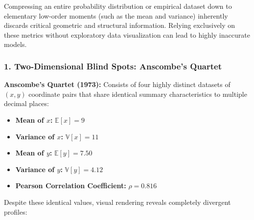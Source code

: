\documentclass{article}
\begin{document}
Compressing an entire probability distribution or empirical dataset down to elementary low-order moments (such as the mean and variance) inherently discards critical geometric and structural information. Relying exclusively on these metrics without exploratory data visualization can lead to highly inaccurate models.

\subsubsection*{1. Two-Dimensional Blind Spots: Anscombe's Quartet}

\noindent \textbf{Anscombe's Quartet (1973):} Consists of four highly distinct datasets of $(x,y)$ coordinate pairs that share identical summary characteristics to multiple decimal places:
\begin{itemize}
    \item \textbf{Mean of $x$:} $\mathbb{E}[x] = 9$
    \item \textbf{Variance of $x$:} $\mathbb{V}[x] = 11$
    \item \textbf{Mean of $y$:} $\mathbb{E}[y] = 7.50$
    \item \textbf{Variance of $y$:} $\mathbb{V}[y] = 4.12$
    \item \textbf{Pearson Correlation Coefficient:} $\rho = 0.816$
\end{itemize}
Despite these identical values, visual rendering reveals completely divergent profiles:
\end{document}

